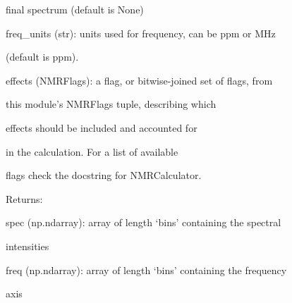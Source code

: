 \documentclass[letterpaper,10pt,english]{sphinxmanual}
\begin{document}
\begin{fulllineitems}
\begin{fulllineitems}
\begin{DUlineblock}{0em}
\begin{DUlineblock}{\DUlineblockindent}
\item[]
\begin{DUlineblock}{\DUlineblockindent}
\item[] final spectrum (default is None)
\end{DUlineblock}
\item[] freq\_units (str): units used for frequency, can be ppm or MHz
\item[]
\begin{DUlineblock}{\DUlineblockindent}
\item[] (default is ppm).
\end{DUlineblock}
\item[] effects (NMRFlags): a flag, or bitwise-joined set of flags, from
\item[]
\begin{DUlineblock}{\DUlineblockindent}
\item[] this module's NMRFlags tuple, describing which
\item[] effects should be included and accounted for
\item[] in the calculation. For a list of available
\item[] flags check the docstring for NMRCalculator.
\end{DUlineblock}
\end{DUlineblock}
\end{DUlineblock}

\begin{DUlineblock}{0em}
\item[] Returns:
\item[]
\begin{DUlineblock}{\DUlineblockindent}
\item[] spec (np.ndarray): array of length `bins' containing the spectral
\item[]
\begin{DUlineblock}{\DUlineblockindent}
\item[] intensities
\end{DUlineblock}
\item[] freq (np.ndarray): array of length `bins' containing the frequency
\item[]
\begin{DUlineblock}{\DUlineblockindent}
\item[] axis
\end{DUlineblock}
\end{DUlineblock}
\end{DUlineblock}

\end{fulllineitems}


\end{fulllineitems}
\end{document}
